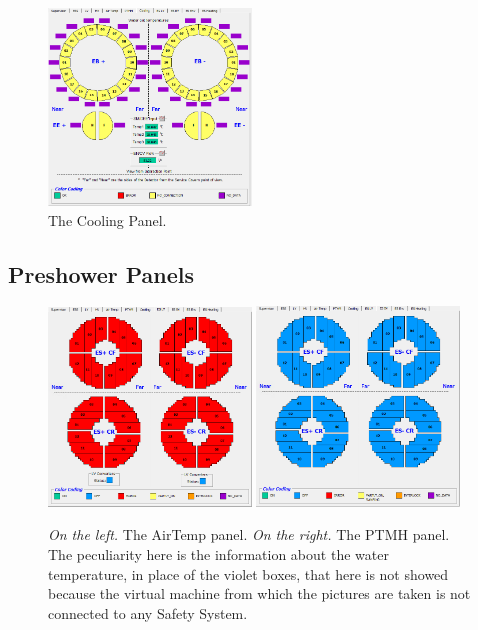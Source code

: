 \documentclass[12pt]{article}
\begin{document}
\begin{figure}[!h]
	\centering
	\includegraphics[width=0.48\textwidth]{Pics/Cooling.png}
	\caption{The Cooling Panel. }
	\label{fig:Cooling}
	
	
\end{figure}


\subsection{Preshower Panels}
\label{sec:Preshower}

\begin{figure}[!h]
	\centering
	\includegraphics[width=0.48\textwidth]{Pics/ESLV.png}
	\quad 
	\includegraphics[width=0.48\textwidth]{Pics/ESBV.png}
	\caption{\textit{On the left.} The AirTemp panel. \textit{On the right.} The PTMH panel. The peculiarity here is the information about the water temperature, in place of the violet boxes, that here is not showed because the virtual machine from which the pictures are taken is not connected to any Safety System.}
	\label{fig:AirPTHM}
\end{figure}
\end{document}
